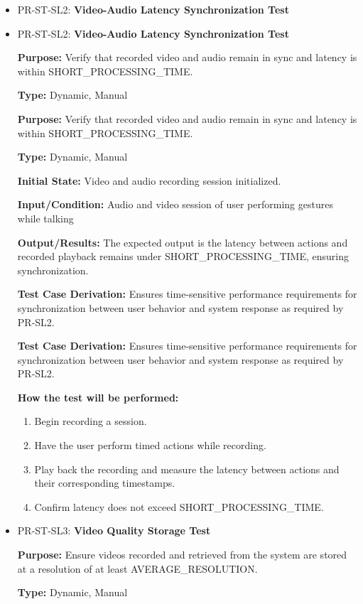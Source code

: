\documentclass[12pt, titlepage]{article}
\begin{document}
\begin{itemize}
\item PR-ST-SL2: \textbf{Video-Audio Latency Synchronization Test}

\item PR-ST-SL2: \textbf{Video-Audio Latency Synchronization Test}
  \begin{mdframed}[linewidth=0.5mm]
      \textbf{Purpose:} Verify that recorded video and audio remain in sync and latency is within SHORT\_PROCESSING\_TIME. \par
      \textbf{Type:} Dynamic, Manual \par
      \textbf{Purpose:} Verify that recorded video and audio remain in sync and latency is within SHORT\_PROCESSING\_TIME. \par
      \textbf{Type:} Dynamic, Manual \par
      \textbf{Initial State:} Video and audio recording session initialized. \par
      \textbf{Input/Condition:} Audio and video session of user performing gestures while talking \par
      \textbf{Output/Results:} The expected output is the latency between actions and recorded playback remains under SHORT\_PROCESSING\_TIME, ensuring synchronization. \par
      \textbf{Test Case Derivation:} Ensures time-sensitive performance requirements for synchronization between user behavior and system response as required by PR-SL2. \par
      \textbf{Test Case Derivation:} Ensures time-sensitive performance requirements for synchronization between user behavior and system response as required by PR-SL2. \par
      \textbf{How the test will be performed:}
      \begin{enumerate}[noitemsep]
        \item Begin recording a session.
        \item Have the user perform timed actions while recording.
        \item Play back the recording and measure the latency between actions and their corresponding timestamps.
        \item Confirm latency does not exceed SHORT\_PROCESSING\_TIME.
      \end{enumerate}
  \end{mdframed}

  \item PR-ST-SL3: \textbf{Video Quality Storage Test}
    \begin{mdframed}[linewidth=0.5mm]
      \textbf{Purpose:} Ensure videos recorded and retrieved from the system are stored at a resolution of at least AVERAGE\_RESOLUTION. \par
      \textbf{Type:} Dynamic, Manual \par


\end{mdframed}
\end{itemize}
\end{document}
